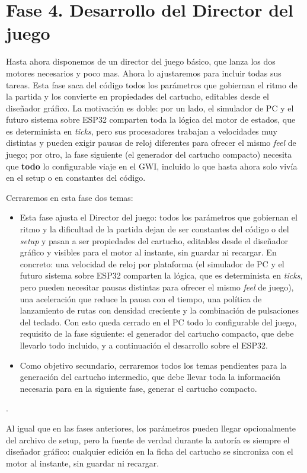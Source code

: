 \section{Fase 4. Desarrollo del Director del juego}
\label{sec:Fase4}

Hasta ahora disponemos de un director del juego básico, que lanza los dos motores necesarios y poco mas. Ahora lo ajustaremos para incluir todas sus tareas. Esta fase saca del código todos los parámetros que gobiernan el ritmo de la partida y los convierte en propiedades del cartucho, editables desde el diseñador gráfico. La motivación es doble: por un lado, el simulador de PC y el futuro sistema sobre ESP32 comparten toda la lógica del motor de estados, que es determinista en \textit{ticks}, pero sus procesadores trabajan a velocidades muy distintas y pueden exigir pausas de reloj diferentes para ofrecer el mismo \textit{feel} de juego; por otro, la fase siguiente (el generador del cartucho compacto) necesita que \textbf{todo} lo configurable viaje en el GWI, incluido lo que hasta ahora solo vivía en el setup o en constantes del código.

Cerraremos en esta fase dos temas: 
\begin{itemize}
	\item Esta fase ajusta el Director del juego: todos los parámetros que gobiernan el ritmo y la dificultad de la partida dejan de ser constantes del código o del \emph{setup} y pasan a ser propiedades del cartucho, editables desde el diseñador gráfico y visibles para el motor al instante, sin guardar ni recargar. En concreto: una velocidad de reloj por plataforma (el simulador de PC y el futuro sistema sobre ESP32 comparten la lógica, que es determinista en \textit{ticks}, pero pueden necesitar pausas distintas para ofrecer el mismo \textit{feel} de juego), una aceleración que reduce la pausa con el tiempo, una política de lanzamiento de rutas con densidad creciente y la combinación de pulsaciones del teclado. Con esto queda cerrado en el PC todo lo configurable del juego, requisito de la fase siguiente: el generador del cartucho compacto, que debe llevarlo todo incluido, y a continuación el desarrollo sobre el ESP32.
	
	\item Como objetivo secundario, cerraremos todos los temas pendientes para la generación del cartucho intermedio, que debe llevar toda la información necesaria para en la siguiente fase, generar el cartucho compacto.
\end{itemize}.

Al igual que en las fases anteriores, los parámetros pueden llegar opcionalmente del archivo de setup, pero la fuente de verdad durante la autoría es siempre el diseñador gráfico: cualquier edición en la ficha del cartucho se sincroniza con el motor al instante, sin guardar ni recargar.

\clearpage